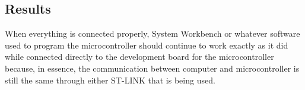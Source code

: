 \documentclass{article}
\begin{document}
  \clearpage

  \subsection{Results}

  When everything is connected properly, System Workbench or whatever software
  used to program the microcontroller should continue to work exactly as it did
  while connected directly to the development board for the microcontroller
  because, in essence, the communication between computer and microcontroller is
  still the same through either ST-LINK that is being used.
\end{document}
